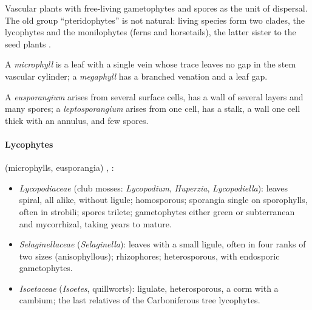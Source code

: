 Vascular plants with free-living
gametophytes and spores as the unit of
dispersal. The old group ``pteridophytes''
is not natural: living species form two
clades, the lycophytes and the monilophytes
(ferns and horsetails), the latter sister to
the seed plants \cite[Chapter
17]{evert2013raven}.

\begin{definition}
\label{definition-microphyll}
A \emph{microphyll} is a leaf with a single
vein whose trace leaves no gap in the stem
vascular cylinder; a \emph{megaphyll} has a
branched venation and a leaf gap.
\end{definition}

\begin{definition}
\label{definition-eusporangium}
A \emph{eusporangium} arises from several
surface cells, has a wall of several layers
and many spores; a \emph{leptosporangium}
arises from one cell, has a stalk, a wall
one cell thick with an annulus, and few
spores.
\end{definition}

\paragraph{Lycophytes} (microphylls,
eusporangia)
\cite[Chapter 17]{evert2013raven},
\cite[Chapter 11]{singh2010plant}:
\begin{itemize}
\item \emph{Lycopodiaceae} (club mosses:
\emph{Lycopodium}, \emph{Huperzia},
\emph{Lycopodiella}): leaves spiral, all
alike, without ligule; homosporous;
sporangia single on sporophylls, often in
strobili; spores trilete; gametophytes
either green or subterranean and
mycorrhizal, taking years to mature.
\item \emph{Selaginellaceae}
(\emph{Selaginella}): leaves with a small
ligule, often in four ranks of two sizes
(anisophyllous); rhizophores; heterosporous,
with endosporic gametophytes.
\item \emph{Isoetaceae} (\emph{Isoetes},
quillworts): ligulate, heterosporous, a corm
with a cambium; the last relatives of the
Carboniferous tree lycophytes.
\end{itemize}

